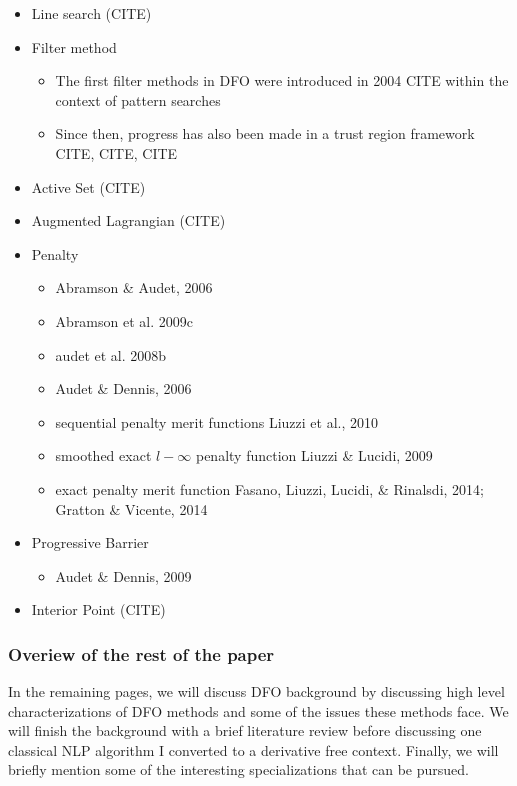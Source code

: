 \documentclass{article}
\begin{document}
\begin{itemize}
	\item Line search (CITE)
	\item Filter method
	\begin{itemize}
		\item The first filter methods in DFO were introduced in 2004 CITE within the context of pattern searches
		\item Since then, progress has also been made in a trust region framework CITE, CITE, CITE
	\end{itemize}
	\item Active Set (CITE)
	\item Augmented Lagrangian (CITE)
	\item Penalty
	\begin{itemize}
		\item Abramson \& Audet, 2006
		\item Abramson et al. 2009c
		\item audet et al. 2008b
		\item Audet \& Dennis, 2006
		\item sequential penalty merit functions Liuzzi et al., 2010
		\item smoothed exact $l-\infty$ penalty function Liuzzi \& Lucidi, 2009
		\item exact penalty merit function Fasano, Liuzzi, Lucidi, \& Rinalsdi, 2014; Gratton \& Vicente, 2014
	\end{itemize}
	\item Progressive Barrier
	\begin{itemize}
		\item Audet \& Dennis, 2009
	\end{itemize}
	\item Interior Point (CITE)
\end{itemize}

\subsubsection{Overiew of the rest of the paper}

In the remaining pages, we will discuss DFO background by discussing high level characterizations of DFO methods and some of the issues these methods face.
We will finish the background with a brief literature review before discussing one classical NLP algorithm I converted to a derivative free context.
Finally, we will briefly mention some of the interesting specializations that can be pursued.
\end{document}
